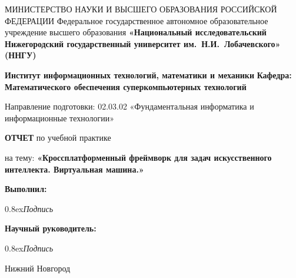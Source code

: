 {
\begin{titlepage}
  \begin{center}
    МИНИСТЕРСТВО НАУКИ И ВЫСШЕГО ОБРАЗОВАНИЯ РОССИЙСКОЙ ФЕДЕРАЦИИ\break
    Федеральное государственное автономное образовательное учреждение высшего образования\break
    \textbf{«Национальный исследовательский Нижегородский государственный университет им.~Н.И.~Лобачевского» (ННГУ)}
    \break

    \vspace*{1.25cm}

    \textbf{Институт информационных технологий, математики и механики}\break
    \textbf{Кафедра: Математического обеспечения суперкомпьютерных технологий}
    \vspace{0.5cm}

    Направление подготовки: 02.03.02 «Фундаментальная информатика и информационные технологии»\break

    \vspace{2.5cm}

    \large{\textbf{ОТЧЕТ}}\break
    по учебной практике\break

    \vspace{0.25cm}

    на тему:\break
    \large{\textbf{«Кроссплатформенный фреймворк для задач искусственного интеллекта. Виртуальная машина.»}}
  \end{center}

\vspace{2cm}

\hfill\textbf{Выполнил:} 

 \hfill \makebox[2cm]{\hrulefill} 

 \hfill  {\raise0.8ex\hbox{\footnotesize \textit{Подпись}}} \makebox[5.65cm]{\hfill}

 \hfill\textbf{Научный руководитель:} 

 \hfill \makebox[2cm]{\hrulefill} 

 \hfill  {\raise0.8ex\hbox{\footnotesize \textit{Подпись}}} \makebox[5.55cm]{\hfill}

\vfill
\begin{center}
  Нижний Новгород
\end{center}
\end{titlepage}
}
